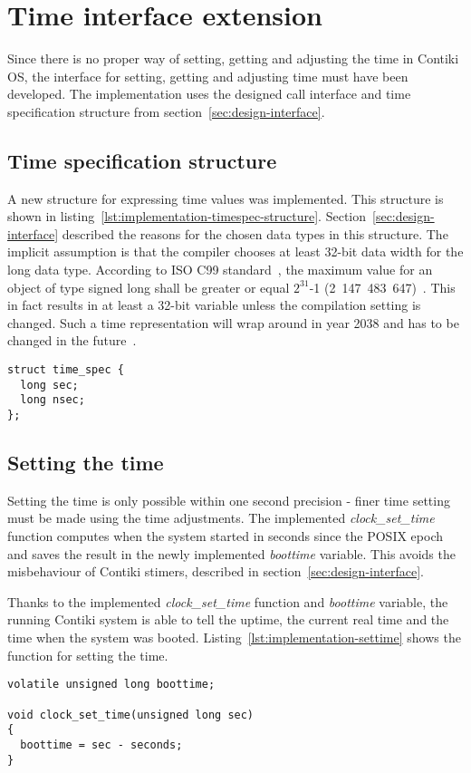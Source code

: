 
\section{Time interface extension}
Since there is no proper way of setting, getting and adjusting the time in Contiki OS,
the interface for setting, getting and adjusting time must have been developed.
The implementation uses the designed call interface and time specification structure
from section~\ref{sec:design-interface}.

\subsection{Time specification structure}
A new structure for expressing time values was implemented.
This structure is shown in listing~\ref{lst:implementation-timespec-structure}.
Section~\ref{sec:design-interface} described the reasons for the chosen data types
in this structure.
The implicit assumption is that the compiler chooses at least 32-bit data width for the long data type.
According to ISO C99 standard~\cite{c99},
the maximum value for an object of type signed long
shall be greater or equal $2^{31}$-1 (2~147~483~647)~\cite{c99}.
This in fact results in at least a 32-bit variable unless the compilation setting is changed.
Such a time representation will wrap around in year 2038
and has to be changed in the future~\cite{posix}.
\begin{lstlisting}[caption={Time specification structure},label={lst:implementation-timespec-structure}]
struct time_spec {
  long sec;
  long nsec;
};
\end{lstlisting}


\subsection{Setting the time}
Setting the time is only possible within one second precision -
finer time setting must be made using the time adjustments.
The implemented {\it{clock\_set\_time}} function computes when the system started
in seconds since the POSIX epoch and saves the result in the newly implemented {\it{boottime}} variable.
This avoids the misbehaviour of Contiki stimers, described in section~\ref{sec:design-interface}.

Thanks to the implemented {\it{clock\_set\_time}} function and {\it{boottime}} variable,
the running Contiki system is able to tell the uptime, the current real time and the time when the system was booted.
Listing~\ref{lst:implementation-settime} shows the function for setting the time.
\begin{lstlisting}[caption={Function for setting the time},label={lst:implementation-settime}]
volatile unsigned long boottime;

void clock_set_time(unsigned long sec)
{
  boottime = sec - seconds;
}
\end{lstlisting}


